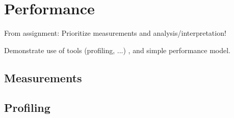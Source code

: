 \section{Performance}

From assignment:
Prioritize measurements and analysis/interpretation!

Demonstrate use of tools (profiling, ...) , and simple performance
model.

\subsection{Measurements}

\subsection{Profiling}

